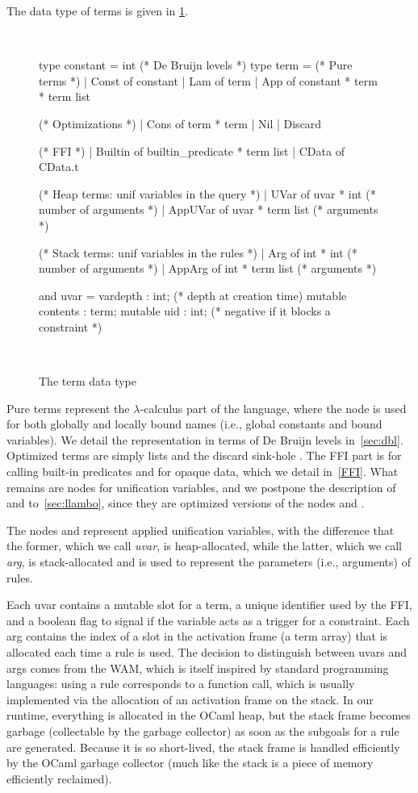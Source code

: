 \documentclass[a4paper, 11pt]{book}
\newenvironment{ocamlcode}
  {\VerbatimEnvironment~\\\begin{ocamlbox}\begin{xocamlcode}}{\end{xocamlcode}
\end{ocamlbox}\\}
\begin{document}
The data type of terms is given in \cref{fig:term}.
\begin{figure}
\begin{ocamlcode}
type constant = int (* De Bruijn levels *)
type term =
  (* Pure terms *)
  | Const of constant
  | Lam of term
  | App of constant * term * term list

  (* Optimizations *)
  | Cons of term * term
  | Nil
  | Discard

  (* FFI *)
  | Builtin of builtin_predicate * term list
  | CData of CData.t

  (* Heap terms: unif variables in the query *)
  | UVar    of uvar * int (* number of arguments *)
  | AppUVar of uvar * term list (* arguments *)

  (* Stack terms: unif variables in the rules *)
  | Arg    of int * int (* number of arguments *)
  | AppArg of int * term list (* arguments *)

and uvar = {
  vardepth : int; (* depth at creation time)
  mutable contents : term;
  mutable uid : int; (* negative if it blocks a constraint *)
}
\end{ocamlcode}
\caption{The term data type\label{fig:term}}
\end{figure}
Pure terms represent the $\lambda$-calculus part of the language, where the
 node is used for both globally and locally bound names (i.e.,
global constants and bound variables). We detail the representation in terms
of De Bruijn levels in~\cref{sec:dbl}. Optimized terms are simply lists and
the discard sink-hole \elpi{_}. The FFI part is for calling built-in
predicates and for opaque data, which we detail in~\cref{FFI}. What remains
are nodes for unification variables, and we postpone the description of
 and  to~\cref{sec:llambo}, since they are optimized
versions of the nodes  and .


The nodes  and  represent applied unification
variables, with the difference that the former, which we call \emph{uvar}, is
heap-allocated, while the latter, which we call \emph{arg}, is stack-allocated
and is used to represent the parameters (i.e., arguments) of rules.


Each uvar contains a mutable slot for a term, a unique identifier used by the
FFI, and a boolean flag to signal if the variable acts as a trigger for a
constraint. Each arg contains the index of a slot in the activation frame (a
term array) that is allocated each time a rule is used. The decision to
distinguish between uvars and args comes from the WAM, which is itself inspired by
standard programming languages: using a rule corresponds to a function call,
which is usually implemented via the allocation of an activation frame on the
stack. In our runtime, everything is allocated in the OCaml heap, but the
stack frame becomes garbage (collectable by the garbage collector) as soon as
the subgoals for a rule are generated. Because it is so short-lived, the stack
frame is handled efficiently by the OCaml garbage collector (much like the
stack is a piece of memory efficiently reclaimed).
\end{document}
